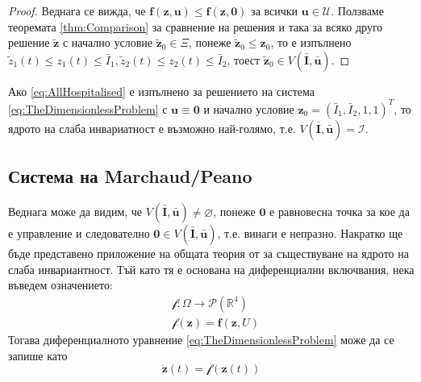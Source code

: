 \begin{proof}
  Веднага се вижда, че $\mathbf{f}(\mathbf{z}, \mathbf{u}) \leq \mathbf{f}(\mathbf{z}, \mathbf{0})$ за всички $\mathbf{u} \in \mathscr{U}$.
  Ползваме теоремата \eqref{thm:Comparison} за сравнение на решения и така за всяко друго решение $\tilde{\mathbf{z}}$ с начално условие $\tilde{\mathbf{z}}_0 \in \Xi$, понеже $\tilde{\mathbf{z}}_0 \leq \mathbf{z}_0$, то е изпълнено $\tilde{z}_1(t) \leq z_1(t) \leq \bar{I}_1, \tilde{z}_2(t) \leq z_2(t) \leq \bar{I}_2$, тоест $\tilde{\mathbf{z}}_0 \in V(\bar{\mathbf{I}}, \bar{\mathbf{u}})$.
\end{proof}

\begin{corollary}
  Ако \eqref{eq:AllHospitalised} е изпълнено за решението на система \eqref{eq:TheDimensionlessProblem} с $\mathbf{u} \equiv \mathbf{0}$ и начално условие $\mathbf{z}_0 = (\bar{I}_1, \bar{I}_2, 1, 1)^T$, то ядрото на слаба инвариатност е възможно най-голямо, т.е. $V(\bar{\mathbf{I}}, \bar{\mathbf{u}}) = \mathscr{I}$.
\end{corollary}

\subsection{Система на Marchaud/Peano}
Веднага може да видим, че $V(\bar{\mathbf{I}}, \bar{\mathbf{u}}) \neq \varnothing$, понеже $\mathbf{0}$ е равновесна точка за кое да е управление и следователно $\mathbf{0} \in V(\bar{\mathbf{I}}, \bar{\mathbf{u}})$, т.е. винаги е непразно.
Накратко ще бъде представено приложение на общата теория от \cite{Aubin1991} за съществуване на ядрото на слаба инвариантност. Тъй като тя е основана на диференциални включвания, нека въведем означението:
\begin{equation}
  \begin{split}
    &\mathscr{f}:\Omega \rightarrow \mathscr{P}(\mathbb{R}^4)\\
    &\mathscr{f}(\mathbf{z})=\mathbf{f}(\mathbf{z}, U)
  \end{split}
\end{equation}
Тогава диференциалното уравнение \eqref{eq:TheDimensionlessProblem} може да се запише като
\begin{equation}
  \dot{\mathbf{z}}(t) = \mathscr{f}(\mathbf{z}(t))
\end{equation}


